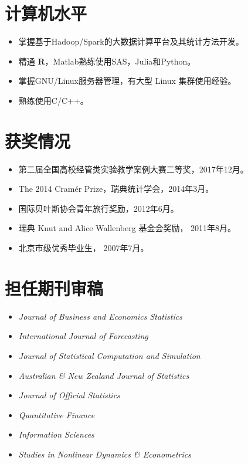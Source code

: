 \documentclass[twoside,a4paper,10pt]{amsart}
\begin{document}
\section*{计算机水平}
\begin{itemize}

\item 掌握基于Hadoop/Spark的大数据计算平台及其统计方法开发。

\item  精通 \textbf{R}，Matlab熟练使用SAS，Julia和Python。

\item  掌握GNU/Linux服务器管理，有大型 Linux 集群使用经验。

\item  熟练使用C/C++。
\end{itemize}

\section*{获奖情况}
\begin{itemize}

\item 第二届全国高校经管类实验教学案例大赛二等奖，2017年12月。
\item The 2014 Cramér Prize，瑞典统计学会，2014年3月。

\item 国际贝叶斯协会青年旅行奖励，2012年6月。

\item 瑞典 Knut and Alice Wallenberg 基金会奖励， 2011年8月。

\item 北京市级优秀毕业生， 2007年7月。
\end{itemize}

\section*{担任期刊审稿}
\begin{itemize}
\item  \emph{Journal of Business and Economics Statistics}
\item  \emph{International Journal of Forecasting}
\item  \emph{Journal of Statistical Computation and Simulation}
\item  \emph{Australian \& New Zealand Journal of Statistics}
\item  \emph{Journal of Official Statistics}
\item  \emph{Quantitative Finance}
\item  \emph{Information Sciences}
\item  \emph{Studies in Nonlinear Dynamics \& Econometrics}
\end{itemize}
\end{document}
